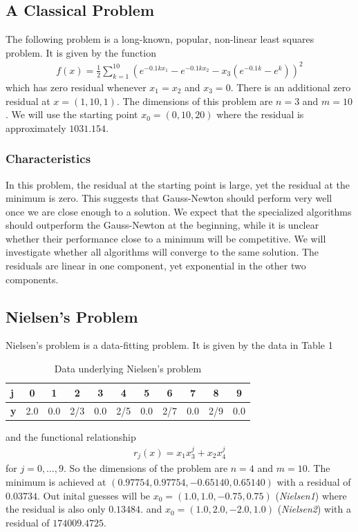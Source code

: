 \documentclass{article}
\theoremstyle{plain}%
\theoremstyle{definition}
\begin{document}
\subsection{A Classical Problem}
The following problem is a long-known, popular, non-linear least squares problem. It is given by
the function 
\begin{align*}
  f(x)=\frac{1}{2}\sum_{k=1}^{10} \left(e^{-0.1kx_1}-e^{-0.1kx_2}-x_3\left(e^{-0.1k}-e^{k} \right) \right)^2
\end{align*}
which has zero residual whenever $x_1=x_2$ and $x_3=0$. There is an additional zero
residual at $x=(1,10,1)$. The dimensions of this problem are 
$n=3$ and $m=10$. We will use the starting point $x_0=(0,10,20)$ where the residual
is approximately $1031.154$. 
\subsubsection{Characteristics}
In this problem, the residual at the starting point is large, yet the residual at the minimum
is zero. This suggests that Gauss-Newton should perform very well once we are close enough 
to a solution. We expect that the specialized algorithms should outperform the Gauss-Newton
at the beginning, while it is unclear whether their performance close to a minimum will be
competitive. We will  investigate whether all algorithms will converge to the same solution.
The residuals are linear in one component, yet exponential in the other two components.
\subsection{Nielsen's Problem}
Nielsen's problem is a data-fitting problem.  It is given by the data in Table 1
\begin{table}[H]
  \centering
  \begin{tabular}{|l|c|c|c|c|c|c|c| c|c|c|}
    \hline
   \textbf{j} & 0 & 1 & 2 &3 & 4 & 5 & 6 & 7 & 8 & 9 \\ \hline
  \textbf{y}  & 2.0 & 0.0 & 2/3  &0.0 & 2/5 & 0.0 & 2/7 & 0.0 & 2/9 & 0.0 \\ \hline
  \end{tabular}
  \caption{Data underlying Nielsen's problem}
  \label{tab:dataNielsen}
\end{table}
and the functional relationship 
\begin{align*}
  r_j(x)=x_1x_3^j+x_2x_4^j
\end{align*}
for $j=0,\ldots,9$. So the dimensions of the problem are $n=4$ and $m=10$. 
The minimum is achieved at $(0.97754,0.97754,-0.65140,0.65140)$ with a residual of
$0.03734$. Out inital guesses will be $x_0=(1.0,1.0,-0.75,0.75)$ (\emph{Nielsen1}) where the residual is
also only $0.13484$. and $x_0=(1.0,2.0,-2.0,1.0)$ (\emph{Nielsen2}) with a residual of  $174009.4725$.
\end{document}
